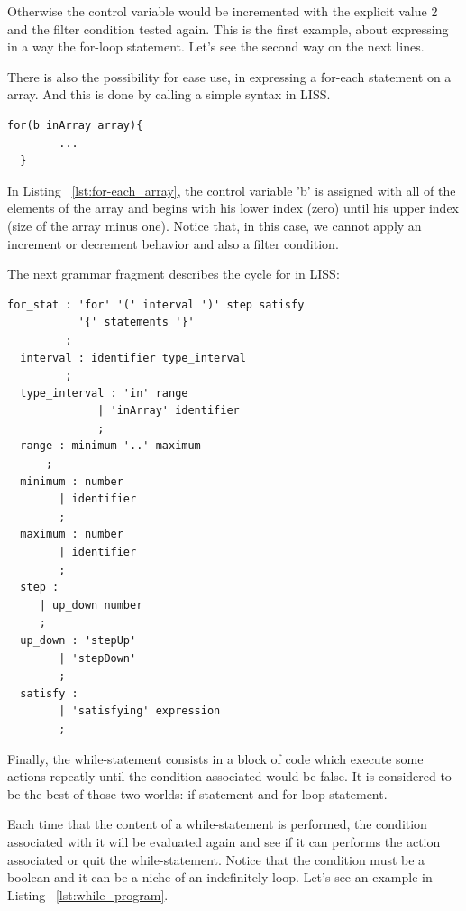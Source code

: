 \documentclass[
  oneside,
  11pt, a4paper,
  footinclude=true,
  headinclude=true,
  cleardoublepage=empty
]{scrbook}
\begin{document}
Otherwise the control variable would be incremented with the explicit value 2 and the filter condition tested again. 
This is the first example, about expressing in a way the for-loop statement. Let's see the second way on the next lines.

There is also the possibility for ease use, in expressing a for-each statement on a array.
And this is done by calling a simple syntax in LISS.

\begin{lstlisting}[caption={LISS syntax of a for-each statement on array},label={lst:for-each_array}]
  for(b inArray array){
       	...
  }
\end{lstlisting}
In Listing ~\ref{lst:for-each_array}, the control variable  'b' is assigned with all of the elements of the array and begins with his lower index (zero) until his upper index (size of the array minus one).
Notice that, in this case, we cannot apply an increment or decrement behavior and also a filter condition.

The next grammar fragment describes the cycle for in LISS:

\begin{lstlisting}[caption={BNF of for statement in LISS}]
  for_stat : 'for' '(' interval ')' step satisfy
           '{' statements '}'
         ;
  interval : identifier type_interval
         ;
  type_interval : 'in' range
              | 'inArray' identifier
              ;
  range : minimum '..' maximum
      ;
  minimum : number
        | identifier
        ;
  maximum : number
        | identifier
        ;
  step :
     | up_down number
     ;
  up_down : 'stepUp'
        | 'stepDown'
        ;
  satisfy :
        | 'satisfying' expression
        ;
\end{lstlisting}


Finally, the while-statement consists in a block of code which execute some actions repeatly until the condition associated would be false. It is considered to be the best of those two worlds: if-statement and for-loop statement.

Each time that the content of a while-statement is performed, the condition associated with it will be evaluated again and see if it can performs the action associated or quit the while-statement.
Notice that the condition must be a boolean and it can be a niche of an indefinitely loop.
Let's see an example in Listing ~\ref{lst:while_program}.
\end{document}
